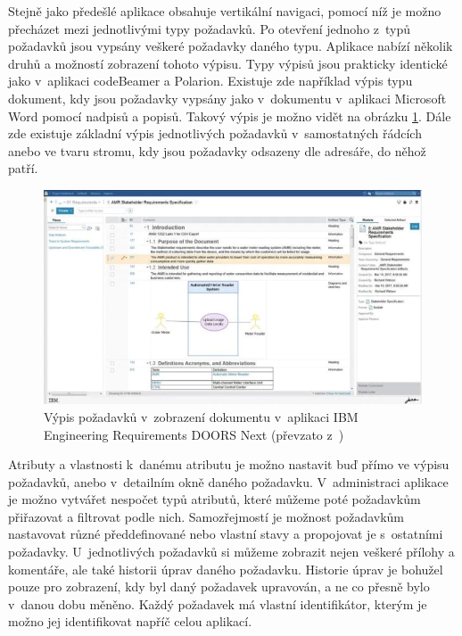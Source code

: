 \documentclass[czech,master]{diploma}
\begin{document}
Stejně jako předešlé aplikace obsahuje vertikální navigaci, pomocí níž je možno přecházet mezi jednotlivými typy požadavků. Po otevření jednoho z~typů požadavků jsou vypsány veškeré požadavky daného typu. Aplikace nabízí několik druhů a možností zobrazení tohoto výpisu. Typy výpisů jsou prakticky identické jako v~aplikaci codeBeamer a Polarion. Existuje zde například výpis typu dokument, kdy jsou požadavky vypsány jako v~dokumentu v~aplikaci Microsoft Word pomocí nadpisů a popisů. Takový výpis je možno vidět na obrázku \ref{fig:ibm_doors_req}. Dále zde existuje základní výpis jednotlivých požadavků v~samostatných řádcích anebo ve tvaru stromu, kdy jsou požadavky odsazeny dle adresáře, do něhož patří.

\begin{figure}[!ht]
    \centering
    \includegraphics[width=1\textwidth]{Diplomka/Figures/ibm_doors_ng_req.png}
    \caption{Výpis požadavků v~zobrazení dokumentu v~aplikaci IBM Engineering Requirements DOORS Next (převzato z~\cite{ref:ibm_jazz_erm_dn})}
    \label{fig:ibm_doors_req}
\end{figure}
Atributy a vlastnosti k~danému atributu je možno nastavit buď přímo ve výpisu požadavků, anebo v~detailním okně daného požadavku. V~administraci aplikace je možno vytvářet nespočet typů atributů, které můžeme poté požadavkům přiřazovat a filtrovat podle nich. Samozřejmostí je možnost požadavkům nastavovat různé předdefinované nebo vlastní stavy a propojovat je s~ostatními požadavky. U~jednotlivých požadavků si můžeme zobrazit nejen veškeré přílohy a komentáře, ale také historii úprav daného požadavku. Historie úprav je bohužel pouze pro zobrazení, kdy byl daný požadavek upravován, a ne co přesně bylo v~danou dobu měněno. Každý požadavek má vlastní identifikátor, kterým je možno jej identifikovat napříč celou aplikací.
\end{document}
